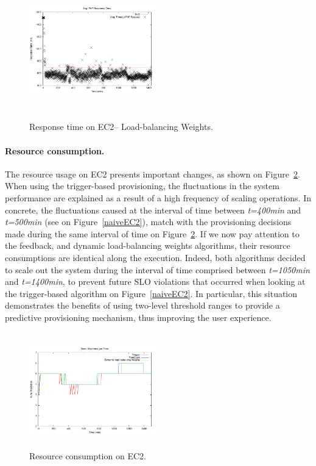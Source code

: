 \begin{figure}
\begin{center}
\includegraphics[width=0.49\textwidth, height=6cm]{./images/heterogeneous/avgTimeout_PhP_DLBweights}
\end{center}
\vspace{-5mm}
\caption{Response time on EC2-- Load-balancing Weights.}
\label{historyWeightEC2}
\end{figure}

\paragraph{Resource consumption.}

The resource usage on EC2 presents important changes, as shown on Figure~\ref{resEC2}. When using the trigger-based provisioning, the fluctuations in the system performance are explained as a result of a high frequency of scaling operations. In concrete, the fluctuations caused at the interval of time between \emph{t=400min} and \emph{t=500min} (see on Figure~\ref{naiveEC2}), match with the provisioning decisions made during the same interval of time on Figure~\ref{resEC2}. If we now pay attention to the feedback, and dynamic load-balancing weights algorithms, their resource consumptions are identical along the execution. Indeed, both algorithms decided to scale out the system during the interval of time comprised between \emph{t=1050min} and \emph{t=1400min}, to prevent future SLO violations that occurred when looking at the trigger-based algorithm on Figure~\ref{naiveEC2}. In particular, this situation demonstrates the benefits of using two-level threshold ranges to provide a predictive provisioning mechanism, thus improving the user experience.


\begin{figure}
\begin{center}
\includegraphics[width=0.49\textwidth, height=5cm]{./images/heterogeneous/numMachinesCompEC2}
\end{center}
\vspace{-5mm}
\caption{Resource consumption on EC2.}
\label{resEC2}
\end{figure}


